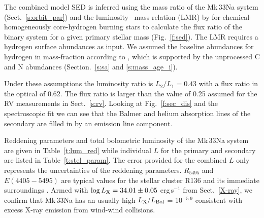 \documentclass[fleqn,usenatbib]{mnras}
\begin{document}
The combined model SED is inferred using the mass ratio of the Mk\,33Na system (Sect.~\ref{s:orbit_par}) and the luminosity\,--\,mass relation (LMR) by \citet[Eq. 9 with coefficients from row 1 of Table A.1]{graefener2011} for chemical-homogeneously core-hydrogen burning stars to calculate the flux ratio of the binary system for a given primary stellar mass (Fig.~\ref{f:sed}). The LMR requires a hydrogen surface abundances as input. We assumed the baseline abundances for hydrogen in mass-fraction according to \citet[$X=0.7391$]{brott2011}, which is supported by the unprocessed C and N abundances (Section.~\ref{s:sa} and \ref{s:mass_age_i}).

Under these assumptions the luminosity ratio is $L_2/L_1 = 0.43$ with a flux ratio in the optical of 0.62. The flux ratio is larger than the value of 0.25 assumed for the RV measurements in Sect.~\ref{s:rv}. Looking at Fig.~\ref{f:sec_dis} and the spectroscopic fit we can see that the Balmer and helium absorption lines of the secondary are filled in by an emission line component.%


Reddening parameters and total bolometric luminosity of the Mk\,33Na system are given in Table~\ref{t:lum_red} while individual $L$ for the primary and secondary are listed in Table~\ref{t:stel_param}. %
The error provided for the combined $L$ only represents the uncertainties of the reddening parameters. $R_{5495}$ and $E(4405-5495)$ are typical values for the stellar cluster R136 and its immediate surroundings \citep[e.g.][]{doran2013, bestenlehner2020b}. Armed with $\log L_{\rm X} = 34.01 \pm 0.05$ erg\,s$^{-1}$ from Sect.~\ref{X-ray}, we confirm that Mk\,33Na has an usually high $L_{\rm X}/L_{\rm Bol}$ = 10$^{-5.9}$ consistent with excess X-ray emission from wind-wind collisions. 
\end{document}
